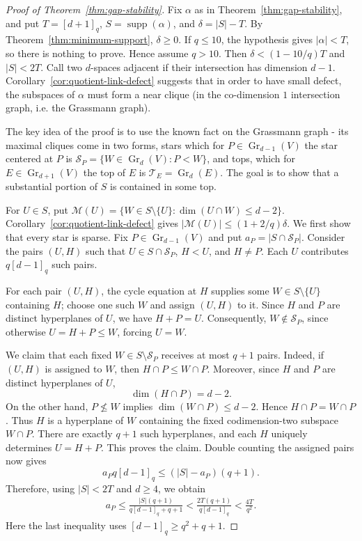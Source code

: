\documentclass[11pt]{article}
\numberwithin{equation}{section}
\newcommand{\Gr}{\operatorname{Gr}}
\newcommand{\supp}{\operatorname{supp}}
\begin{document}
\begin{proof}[Proof of Theorem~\ref{thm:gap-stability}]
Fix $\alpha$ as in Theorem~\ref{thm:gap-stability}, and put
$T=[d+1]_q$, $S=\supp(\alpha)$, and $\delta=|S|-T$.
By Theorem~\ref{thm:minimum-support}, $\delta\ge0$.  If $q\le10$, the hypothesis gives
$|\alpha|<T$, so there is nothing to prove. Hence assume $q>10$. Then
$\delta<(1-10/q)T$ and $|S|<2T$.
Call two $d$-spaces adjacent if their intersection has dimension
$d-1$. Corollary~\ref{cor:quotient-link-defect} suggests that in order to have small defect, the subspaces of $\alpha$ must form a near clique (in the co-dimension $1$ intersection graph, i.e. the Grassmann graph).

The key idea of the proof is to use the known fact on the Grassmann graph - its maximal cliques come in two forms, stars which for $P\in\Gr_{d-1}(V)$ the star centered at $P$ is $\mathcal S_P=\{W\in\Gr_d(V):P<W\}$, and tops, which for $E\in\Gr_{d+1}(V)$ the top of $E$ is $\mathcal T_E=\Gr_d(E)$. The goal is to show that a substantial portion of $S$ is contained in some top.

For $U\in S$, put
$\mathcal M(U)=
\{W\in S\setminus\{U\}:\dim(U\cap W)\le d-2\}$.
Corollary~\ref{cor:quotient-link-defect} gives
$|\mathcal M(U)|\le(1+2/q)\delta$.
We first show that every star is sparse. Fix $P\in\Gr_{d-1}(V)$ and put
$a_P=|S\cap\mathcal S_P|$. Consider the pairs $(U,H)$ such that
$U\in S\cap\mathcal S_P$, $H<U$, and $H\ne P$. Each $U$ contributes
$q[d-1]_q$ such pairs.

For each pair $(U,H)$, the cycle equation at $H$ supplies some
$W\in S\setminus\{U\}$ containing $H$; choose one such $W$ and assign
$(U,H)$ to it. Since $H$ and $P$ are distinct hyperplanes of $U$, we
have $H+P=U$. Consequently, $W\notin\mathcal S_P$, since otherwise
$U=H+P\le W$, forcing $U=W$.

We claim that each fixed $W\in S\setminus\mathcal S_P$ receives at most
$q+1$ pairs. Indeed, if $(U,H)$ is assigned to $W$, then
$H\cap P\le W\cap P$. Moreover, since $H$ and $P$ are distinct
hyperplanes of $U$,
\[
\dim(H\cap P)=d-2.
\]
On the other hand, $P\nleq W$ implies $\dim(W\cap P)\le d-2$. Hence
$H\cap P=W\cap P$. Thus $H$ is a hyperplane of $W$ containing the fixed
codimension-two subspace $W\cap P$. There are exactly $q+1$ such
hyperplanes, and each $H$ uniquely determines $U=H+P$. This proves the
claim.
Double counting the assigned pairs now gives
\[
a_Pq[d-1]_q\le (|S|-a_P)(q+1).
\]
Therefore, using $|S|<2T$ and $d\ge4$, we obtain
\begin{equation}\label{eq:star-sparse}
\begin{aligned}
a_P \le \frac{|S|(q+1)}{q[d-1]_q+q+1}<\frac{2T(q+1)}{q[d-1]_q}<\frac{4T}{q^2}.
\end{aligned}
\end{equation}
Here the last inequality uses $[d-1]_q\ge q^2+q+1$.












\end{proof}
\end{document}
